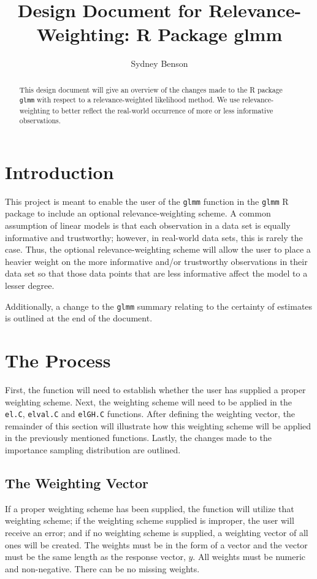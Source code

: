 \documentclass{article}
\title{Design Document for Relevance-Weighting: R Package glmm}
\author{Sydney Benson}
\begin{document}
\maketitle{}

\begin{abstract}
This design document will give an overview of the changes made to the R package \texttt{glmm} with respect to a relevance-weighted likelihood method. We use relevance-weighting to better reflect the real-world occurrence of more or less informative observations.
\end{abstract}

\section{Introduction}
This project is meant to enable the user of the \texttt{glmm} function in the \texttt{glmm} R package to include an optional relevance-weighting scheme. A common assumption of linear models is that each observation in a data set is equally informative and trustworthy; however, in real-world data sets, this is rarely the case. Thus, the optional relevance-weighting scheme will allow the user to place a heavier weight on the more informative and/or trustworthy observations in their data set so that those data points that are less informative affect the model to a lesser degree.

Additionally, a change to the \texttt{glmm} summary relating to the certainty of estimates is outlined at the end of the document.

\section{The Process}
First, the function will need to establish whether the user has supplied a proper weighting scheme. Next, the weighting scheme will need to be applied in the \texttt{el.C}, \texttt{elval.C} and \texttt{elGH.C} functions. After defining the weighting vector, the remainder of this section will illustrate how this weighting scheme will be applied in the previously mentioned functions. Lastly, the changes made to the importance sampling distribution are outlined.

\subsection{The Weighting Vector}
If a proper weighting scheme has been supplied, the function will utilize that weighting scheme; if  the weighting scheme supplied is improper, the user will receive an error; and if no weighting scheme is supplied, a weighting vector of all ones will be created. The weights must be in the form of a vector and the vector must be the same length as the response vector, $y$. All weights must be numeric and non-negative. There can be no missing weights. 
\end{document}
